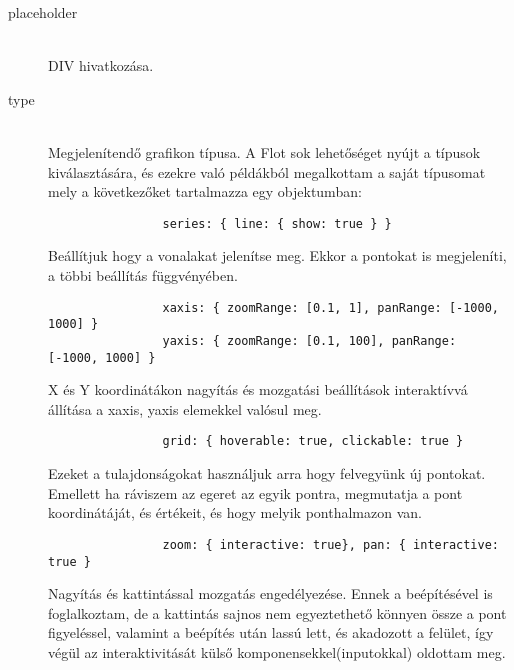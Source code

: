 	\begin{description}
		\item[placeholder] \hfill \\ 
 			DIV hivatkozása.
 		 \item[type] \hfill \\ 
 			Megjelenítendő grafikon típusa.
 			\newline
 			A Flot sok lehetőséget nyújt a típusok kiválasztására, és ezekre való példákból megalkottam a saját típusomat mely a következőket tartalmazza egy objektumban:
	 		\begin{verbatim}
				series: { line: { show: true } } 
	 		\end{verbatim}
			Beállítjuk hogy a vonalakat jelenítse meg. Ekkor a pontokat is megjeleníti, a többi beállítás függvényében.
	 		
	 		\begin{verbatim}
				xaxis: { zoomRange: [0.1, 1], panRange: [-1000, 1000] }
				yaxis: { zoomRange: [0.1, 100], panRange: [-1000, 1000] }
	 		\end{verbatim} 
	 		X és Y koordinátákon nagyítás és mozgatási beállítások interaktívvá állítása a xaxis, yaxis elemekkel valósul meg.
		 	\begin{verbatim}
				grid: { hoverable: true, clickable: true }
		 	\end{verbatim} 
		 	Ezeket a tulajdonságokat használjuk arra hogy felvegyünk új pontokat.\newline
		 	Emellett ha ráviszem az egeret az egyik pontra, megmutatja a pont koordinátáját, és értékeit, és hogy melyik ponthalmazon van.
		 	\begin{verbatim}
				zoom: { interactive: true}, pan: { interactive: true }
		 	\end{verbatim} 
		 	Nagyítás és kattintással mozgatás engedélyezése. \newline
			Ennek a beépítésével is foglalkoztam, de a kattintás sajnos nem egyeztethető könnyen össze a pont figyeléssel, valamint a beépítés után lassú lett, és akadozott a felület, így végül az interaktivitását külső komponensekkel(inputokkal) oldottam meg.


\end{description}
